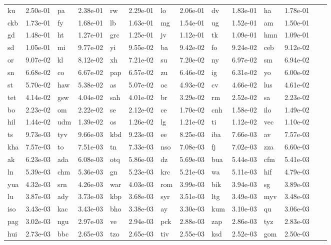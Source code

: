 \begin{table}
\begin{tabular}{ll|ll|ll|ll|ll|ll|ll}
ku & 2.50e-01 & pa & 2.38e-01 & rw & 2.29e-01 & lo & 2.06e-01 & dv & 1.83e-01 & ha & 1.78e-01 \\
ckb & 1.73e-01 & fy & 1.68e-01 & lb & 1.63e-01 & mg & 1.54e-01 & ug & 1.52e-01 & am & 1.50e-01 \\
gd & 1.48e-01 & ht & 1.27e-01 & grc & 1.25e-01 & jv & 1.12e-01 & tk & 1.09e-01 & hmn & 1.09e-01 \\
sd & 1.05e-01 & mi & 9.77e-02 & yi & 9.55e-02 & ba & 9.42e-02 & fo & 9.24e-02 & ceb & 9.12e-02 \\
or & 9.07e-02 & kl & 8.12e-02 & xh & 7.21e-02 & su & 7.20e-02 & ny & 6.97e-02 & sm & 6.94e-02 \\
sn & 6.68e-02 & co & 6.67e-02 & pap & 6.57e-02 & zu & 6.46e-02 & ig & 6.31e-02 & yo & 6.00e-02 \\
st & 5.70e-02 & haw & 5.38e-02 & as & 5.07e-02 & oc & 4.93e-02 & cv & 4.66e-02 & lus & 4.61e-02 \\
tet & 4.14e-02 & gsw & 4.04e-02 & sah & 4.01e-02 & br & 3.29e-02 & rm & 2.52e-02 & sa & 2.23e-02 \\
bo & 2.23e-02 & om & 2.22e-02 & se & 2.12e-02 & ce & 1.70e-02 & cnh & 1.58e-02 & ilo & 1.49e-02 \\
hil & 1.44e-02 & udm & 1.39e-02 & os & 1.26e-02 & lg & 1.21e-02 & ti & 1.12e-02 & vec & 1.10e-02 \\
ts & 9.73e-03 & tyv & 9.66e-03 & kbd & 9.23e-03 & ee & 8.25e-03 & iba & 7.66e-03 & av & 7.57e-03 \\
kha & 7.57e-03 & to & 7.51e-03 & tn & 7.33e-03 & nso & 7.08e-03 & fj & 7.02e-03 & zza & 6.60e-03 \\
ak & 6.23e-03 & ada & 6.08e-03 & otq & 5.86e-03 & dz & 5.69e-03 & bua & 5.44e-03 & cfm & 5.41e-03 \\
ln & 5.39e-03 & chm & 5.36e-03 & gn & 5.23e-03 & krc & 5.21e-03 & wa & 5.11e-03 & hif & 4.79e-03 \\
yua & 4.32e-03 & srn & 4.26e-03 & war & 4.03e-03 & rom & 3.99e-03 & bik & 3.94e-03 & sg & 3.89e-03 \\
lu & 3.87e-03 & ady & 3.73e-03 & kbp & 3.68e-03 & syr & 3.51e-03 & ltg & 3.49e-03 & myv & 3.48e-03 \\
iso & 3.43e-03 & kac & 3.43e-03 & bho & 3.38e-03 & ay & 3.30e-03 & kum & 3.10e-03 & qu & 3.06e-03 \\
pag & 3.02e-03 & ngu & 2.97e-03 & ve & 2.94e-03 & pck & 2.88e-03 & zap & 2.86e-03 & tyz & 2.83e-03 \\
hui & 2.73e-03 & bbc & 2.65e-03 & tzo & 2.65e-03 & tiv & 2.55e-03 & ksd & 2.52e-03 & gom & 2.50e-03 \\

\end{tabular}
\end{table}
